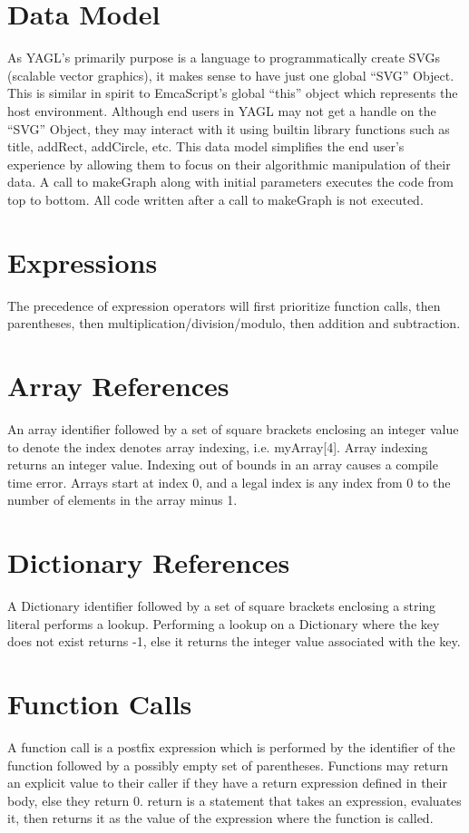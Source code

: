 \documentclass[12pt]{article}
\begin{document}
\section {Data Model}
As YAGL’s primarily purpose is a language to programmatically create SVGs (scalable vector graphics), it makes sense to have just one global “SVG” Object. This is similar in spirit to EmcaScript’s global “this” object which represents the host environment. Although end users in YAGL may not get a handle  on the “SVG” Object, they may interact with it using builtin library functions such as title, addRect, addCircle, etc. This data model simplifies the end user’s experience by allowing them to focus on their algorithmic manipulation of their data. A call to makeGraph along with initial parameters executes the code from top to bottom. All code written after a call to makeGraph is not executed. 

\section{Expressions}
The precedence of expression operators will first prioritize function calls, then parentheses, then multiplication/division/modulo, then addition and subtraction.  

\section{Array References}
An array identifier followed by a set of square brackets enclosing an integer value to denote the index denotes array indexing, i.e. myArray[4].  Array indexing returns an integer value.  Indexing out of bounds in an array causes a compile time error.  Arrays start at index 0, and a legal index is any index from 0 to the number of elements in the array minus 1.

\section{Dictionary References}
A Dictionary identifier followed by a set of square brackets enclosing a string literal performs a lookup. Performing a lookup on a Dictionary where the key does not exist returns -1, else it returns the integer value associated with the key.

\section{Function Calls}
A function call is a postfix expression which is performed by the identifier of the function
followed by a possibly empty set of parentheses. Functions may return an explicit value to their caller if they have a return expression defined in their body, else they return 0.  return is a statement that takes an expression, evaluates it, then returns it as the value of the expression where the function is called.
\end{document}
